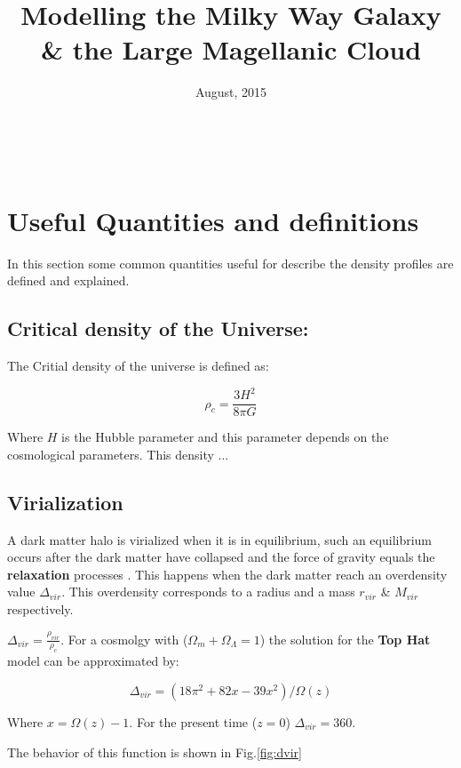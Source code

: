 \documentclass[a4paper, 12pt]{article} %
\title{\textbf{Modelling the Milky Way Galaxy \& the Large Magellanic Cloud}} %
\date{August, 2015} %
\makeatletter
\renewcommand{\maketitle}{ %
\begin{flushright} %
{\LARGE\@title} %

\vspace{50pt} %

{\large\@author} %
\\\@date %

\vspace{40pt} %
\end{flushright}
}
\makeatother
\begin{document}
\maketitle


\section{Useful Quantities and definitions}

In this section some common quantities useful for describe the density profiles
are defined and explained.


\subsection{Critical density of the Universe:}

The Critial density of the universe is defined as:

\begin{equation}
\rho_c = \dfrac{3H^2}{8 \pi G}
\end{equation}

Where $H$ is the Hubble parameter and this parameter depends on the cosmological parameters.
This density ... 

\subsection{Virialization}

A dark matter halo is virialized when it is in equilibrium, such
an equilibrium occurs after the dark matter have collapsed and
the force of gravity equals the \textbf{relaxation} processes
\cite{BinneyTremaine08}. This happens when the dark matter
reach an overdensity value $\Delta_{vir}$. This overdensity corresponds
to a radius and a mass $r_{vir}$ \& $M_{vir}$ respectively. 

 $\Delta_{vir} = \frac{\rho_{vir}}{\rho_c}$.
For a cosmolgy with ($\Omega_m + \Omega_{\Lambda} = 1$) the
solution for the \textbf{Top Hat} model can be  approximated by:

\begin{equation}
\Delta_{vir} = (18 \pi^2 + 82x - 39x^2)/\Omega(z) 
\end{equation}

\cite{EkeColeFrenk96,BryanNorman98} Where $x=\Omega(z)-1$.
For the present time ($z=0$)  $\Delta_{vir}=360$.

The behavior of this function is shown in Fig.\ref{fig:dvir}
\end{document}
